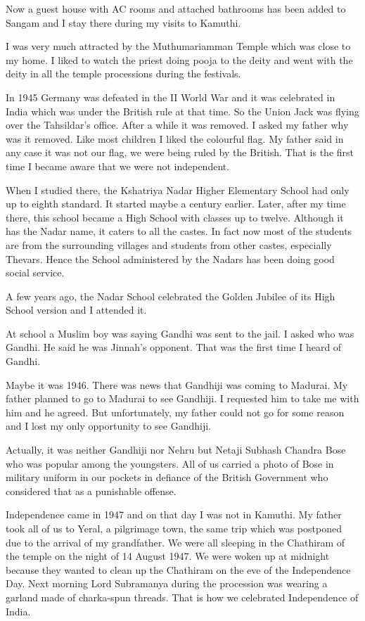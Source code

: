 Now a guest house with AC rooms and attached bathrooms has been added to 
Sangam and I stay there during my visits to Kamuthi.

I was very much attracted by the Muthumariamman Temple which was close 
to my home. I liked to watch the priest doing pooja to the deity and 
went with the deity in all the temple processions during the festivals.
  
In 1945 Germany was defeated in the II World War and it was celebrated 
in India which was under the British rule at that time. So the Union 
Jack was flying over the Tahsildar's office. After a while it was 
removed. I asked my father why was it removed. Like most children I 
liked the colourful flag. My father said in any case it was not our 
flag, we were being ruled by the British. That is the first time I 
became aware that we were not independent.

When I studied there, the Kshatriya Nadar Higher Elementary School had 
only up to eighth standard. It started maybe a century earlier. Later, 
after my time there, this school became a High School with classes up to 
twelve. Although it has the Nadar name, it caters to all the castes. 
In fact now most of the students are from the surrounding villages and 
students from other castes, especially Thevars. Hence 
the School administered by the Nadars has been doing good social 
service.

A few years ago, the Nadar School celebrated the Golden Jubilee of its 
High School version and I attended it.

At school a Muslim boy was saying Gandhi was sent to the jail. I asked 
who was Gandhi. He said he was Jinnah's opponent. That was the first 
time I heard of Gandhi.

Maybe it was 1946. There was news that Gandhiji was coming to Madurai. 
My father planned to go to Madurai to see Gandhiji. I requested him to 
take me with him and he agreed. But unfortunately, my father could not 
go for some reason and I lost my only opportunity to see Gandhiji.

Actually, it was neither Gandhiji nor Nehru but Netaji Subhash Chandra 
Bose who was popular among the youngsters. All of us carried a photo of 
Bose in military uniform in our pockets in defiance of the British 
Government who considered that as a punishable offense.

Independence came in 1947 and on that day I was not in Kamuthi. My 
father took all of us to Yeral, a pilgrimage town, the same trip which 
was postponed due to the arrival of my grandfather. We were all sleeping 
in the Chathiram of the temple on the night of 14 August 1947. We were 
woken up at midnight because they wanted to clean up the Chathiram on 
the eve of the Independence Day. Next morning Lord Subramanya during the 
procession was wearing a garland made of charka-spun threads. That is 
how we celebrated Independence of India.

